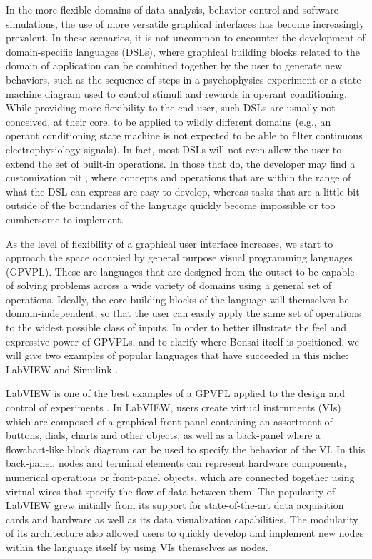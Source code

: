 In the more flexible domains of data analysis, behavior control and software simulations, the use of more versatile graphical interfaces has become increasingly prevalent. In these scenarios, it is not uncommon to encounter the development of domain-specific languages (DSLs), where graphical building blocks related to the domain of application can be combined together by the user to generate new behaviors, such as the sequence of steps in a psychophysics experiment or a state-machine diagram used to control stimuli and rewards in operant conditioning. While providing more flexibility to the end user, such DSLs are usually not conceived, at their core, to be applied to wildly different domains (e.g., an operant conditioning state machine is not expected to be able to filter continuous electrophysiology signals). In fact, most DSLs will not even allow the user to extend the set of built-in operations. In those that do, the developer may find a customization pit \cite{Cook2007}, where concepts and operations that are within the range of what the DSL can express are easy to develop, whereas tasks that are a little bit outside of the boundaries of the language quickly become impossible or too cumbersome to implement.

As the level of flexibility of a graphical user interface increases, we start to approach the space occupied by general purpose visual programming languages (GPVPL). These are languages that are designed from the outset to be capable of solving problems across a wide variety of domains using a general set of operations. Ideally, the core building blocks of the language will themselves be domain-independent, so that the user can easily apply the same set of operations to the widest possible class of inputs. In order to better illustrate the feel and expressive power of GPVPLs, and to clarify where Bonsai itself is positioned, we will give two examples of popular languages that have succeeded in this niche: LabVIEW \cite{Instruments2014} and Simulink \cite{MathWorks2014}.

LabVIEW is one of the best examples of a GPVPL applied to the design and control of experiments \cite{Elliott2007}. In LabVIEW, users create virtual instruments (VIs) which are composed of a graphical front-panel containing an assortment of buttons, dials, charts and other objects; as well as a back-panel where a flowchart-like block diagram can be used to specify the behavior of the VI. In this back-panel, nodes and terminal elements can represent hardware components, numerical operations or front-panel objects, which are connected together using virtual wires that specify the flow of data between them. The popularity of LabVIEW grew initially from its support for state-of-the-art data acquisition cards and hardware as well as its data visualization capabilities. The modularity of its architecture also allowed users to quickly develop and implement new nodes within the language itself by using VIs themselves as nodes.


